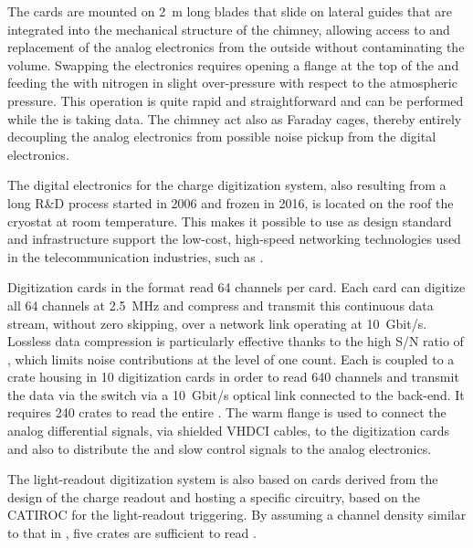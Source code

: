 The  cards are mounted on \SI{2}{m} long blades that slide on lateral guides that are integrated into the mechanical structure of the chimney, allowing access to and replacement of the analog  electronics from the outside without contaminating the \lar volume. 
Swapping the  electronics requires opening a flange at the top of the  and feeding the  with nitrogen in slight over-pressure with respect to the atmospheric pressure.  This operation is quite rapid and straightforward and can be performed while the  is taking data. The chimney act also as Faraday cages, thereby entirely decoupling the analog  electronics 
from possible noise pickup from the digital electronics.   

The digital electronics for the charge digitization system, also resulting from a long R\&D process started in 2006 and frozen in 2016, is located 
on the roof the cryostat at room temperature. This makes it possible to use as design standard and infrastructure support the low-cost, high-speed networking technologies used in the telecommunication industries, such as . 

Digitization cards in the  format read \num{64} channels per card. Each  card can digitize all  \num{64} channels at \SI{2.5}{MHz} and compress and transmit this continuous data stream, without zero skipping, over a network link operating at \SI{10}{Gbit/s}. Lossless data compression is particularly effective thanks to the high S/N ratio  of \dual{}, which limits noise contributions at the level of one  count. Each  is coupled to a  crate housing in \num{10}  digitization cards in order to read  \num{640} channels and transmit the data via the  switch via a \SI{10}{Gbit/s} optical link connected to the  back-end. It requires \num{240}  crates to read the entire . The  warm flange is used to connect the analog differential signals, via shielded VHDCI cables, to the  digitization cards and also to distribute the  and slow control signals to the analog  electronics.  

The light-readout digitization system is also based on   cards derived from the design of the charge readout and hosting a specific circuitry, based on the CATIROC  for the light-readout triggering. By assuming a  channel density similar to that in , five  crates are sufficient to read \dpnumpmtch {}.

